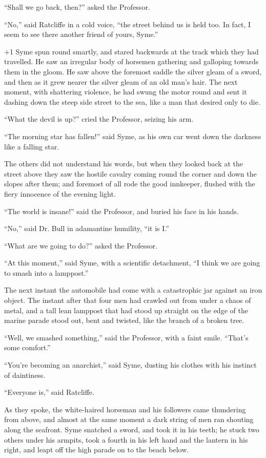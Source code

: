 “Shall we go back, then?” asked the Professor.

“No,” said Ratcliffe in a cold voice, “the street behind us is held too. In fact, I seem to see there another friend of yours, Syme.”

\looseness+1
Syme spun round smartly, and stared backwards at the track which they had travelled. He saw an irregular body of horsemen gathering and galloping towards them in the gloom. He saw above the foremost saddle the silver gleam of a sword, and then as it grew nearer the silver gleam of an old man’s hair. The next moment, with shattering violence, he had swung the motor round and sent it dashing down the steep side street to the sea, like a man that desired only to die.

“What the devil is up?” cried the Professor, seizing his arm.

“The morning star has fallen!” said Syme, as his own car went down the darkness like a falling star.

The others did not understand his words, but when they looked back at the street above they saw the hostile cavalry coming round the corner and down the slopes after them; and foremost of all rode the good innkeeper, flushed with the fiery innocence of the evening light.

“The world is insane!” said the Professor, and buried his face in his hands.

“No,” said Dr. Bull in adamantine humility, “it is I.”

“What are we going to do?” asked the Professor.

“At this moment,” said Syme, with a scientific detachment, “I think we are going to smash into a lamppost.”

The next instant the automobile had come with a catastrophic jar against an iron object. The instant after that four men had crawled out from under a chaos of metal, and a tall lean lamppost that had stood up straight on the edge of the marine parade stood out, bent and twisted, like the branch of a broken tree.

“Well, we smashed something,” said the Professor, with a faint smile. “That’s some comfort.”

“You’re becoming an anarchist,” said Syme, dusting his clothes with his instinct of daintiness.

“Everyone is,” said Ratcliffe.

As they spoke, the white-haired horseman and his followers came thundering from above, and almost at the same moment a dark string of men ran shouting along the seafront. Syme snatched a sword, and took it in his teeth; he stuck two others under his armpits, took a fourth in his left hand and the lantern in his right, and leapt off the high parade on to the beach below.

